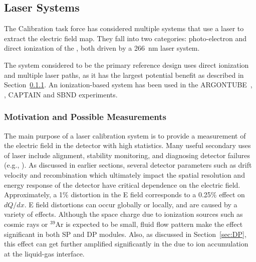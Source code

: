 \subsection{Laser Systems}\label{sec:laser}

The Calibration task force has considered multiple systems that use a laser to extract the electric field map.  They fall into two categories: photo-electron and direct ionization of the , both driven by a \SI{266}{\nano\m} laser system.

The system considered to be the primary reference design 
uses direct ionization and multiple laser paths, as it has the largest potential benefit as described in Section~\ref{sec:laser:motiv}. %
An ionization-based system has been used in the ARGONTUBE~\cite{Zeller:2013sva}, , CAPTAIN and SBND experiments.

\subsubsection{Motivation and Possible Measurements}
\label{sec:laser:motiv}
The main purpose of a laser calibration system is to provide a measurement of the electric field in the detector with high statistics. %
Many useful secondary uses of laser %
include alignment, stability monitoring, and diagnosing detector failures (e.g., ). As discussed in earlier sections, several detector parameters such as drift velocity and recombination which ultimately impact the spatial resolution and energy response of the detector have critical dependence on the electric field. 
Approximately, a \num{1}\% distortion in the E field %
corresponds to a \num{0.25}\% effect on $dQ/dx$. E field distortions can occur globally or locally, and are caused by a variety of effects. Although the space charge due to ionization sources such as cosmic rays or ${}^{39}$Ar is expected to be small, fluid flow pattern make the effect significant in both SP and DP modules. Also, as discussed in Section~\ref{sec:DP}, this effect can get further amplified significantly in the  due to ion accumulation at the liquid-gas interface. 

